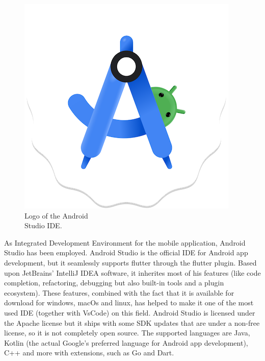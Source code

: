 \begin{figure} %
    \captionsetup{font=footnotesize}
    \centering
    \includegraphics[width=\linewidth]{images/android_studio.png}
    \caption{Logo of the Android\\Studio IDE.}
\end{figure}

As Integrated Development Environment for the mobile application, Android Studio has been employed. Android Studio is the official IDE for Android app development, but it seamlessly supports flutter through the flutter plugin. Based upon JetBrains' IntelliJ IDEA software, it inherites most of his features (like code completion, refactoring, debugging but also built-in tools and a plugin ecosystem). These features, combined with the fact that it is available for download for windows, macOs and linux, has helped to make it one of the most used IDE (together with VsCode) on this field. Android Studio is licensed under the Apache license but it ships with some SDK updates that are under a non-free license, so it is not completely open source. The supported languages are Java, Kotlin (the actual Google's preferred language for Android app development), C++ and more with extensions, such as Go and Dart\cite{AndroidStudio}. 

